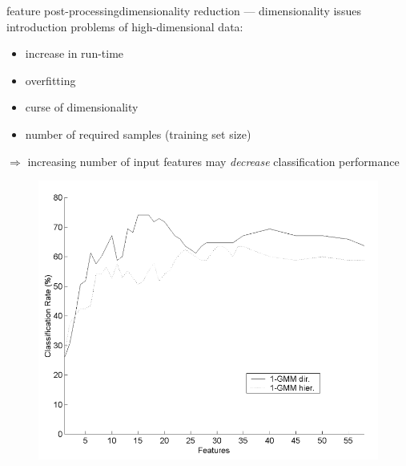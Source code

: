 		\begin{frame}{feature post-processing}{dimensionality reduction --- dimensionality issues introduction}
            problems of high-dimensional data:
            \begin{itemize}
                \item   increase in run-time
                \item   overfitting
                \item   curse of dimensionality
                \item   number of required samples (training set size)
            \end{itemize}
            \pause
			$\Rightarrow$ increasing number of input features may \textit{decrease} classification performance
			
			\begin{figure}
				\centering
				\hspace{-5mm}\vspace{-5mm}
				\includegraphics[scale=.2]{graph/curseofdimensionality}
			\end{figure}
		\end{frame}
